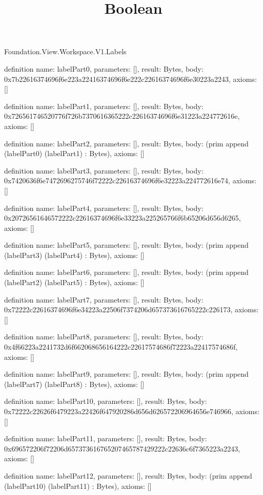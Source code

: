 \begin{lexlean}{Foundation.View.Workspace.V1.Labels}
\title{Boolean}
\begin{semanticmodule}
definition{
  name: labelPart0,
  parameters: [],
  result: Bytes,
  body: 0x7b22616374696f6e223a22416374696f6e222c22616374696f6e30223a2243,
  axioms: []
}

definition{
  name: labelPart1,
  parameters: [],
  result: Bytes,
  body: 0x726561746520776f726b7370616365222c22616374696f6e31223a224772616e,
  axioms: []
}

definition{
  name: labelPart2,
  parameters: [],
  result: Bytes,
  body: (prim append (labelPart0) (labelPart1) : Bytes),
  axioms: []
}

definition{
  name: labelPart3,
  parameters: [],
  result: Bytes,
  body: 0x7420636f6e7472696275746f72222c22616374696f6e32223a224772616e74,
  axioms: []
}

definition{
  name: labelPart4,
  parameters: [],
  result: Bytes,
  body: 0x20726561646572222c22616374696f6e33223a225265766f6b65206d656d6265,
  axioms: []
}

definition{
  name: labelPart5,
  parameters: [],
  result: Bytes,
  body: (prim append (labelPart3) (labelPart4) : Bytes),
  axioms: []
}

definition{
  name: labelPart6,
  parameters: [],
  result: Bytes,
  body: (prim append (labelPart2) (labelPart5) : Bytes),
  axioms: []
}

definition{
  name: labelPart7,
  parameters: [],
  result: Bytes,
  body: 0x72222c22616374696f6e34223a22506f7374206d657373616765222c226173,
  axioms: []
}

definition{
  name: labelPart8,
  parameters: [],
  result: Bytes,
  body: 0x4f66223a2241732d6f662068656164222c22617574686f72223a22417574686f,
  axioms: []
}

definition{
  name: labelPart9,
  parameters: [],
  result: Bytes,
  body: (prim append (labelPart7) (labelPart8) : Bytes),
  axioms: []
}

definition{
  name: labelPart10,
  parameters: [],
  result: Bytes,
  body: 0x72222c22626f6479223a22426f647920286d656d626572206964656e746966,
  axioms: []
}

definition{
  name: labelPart11,
  parameters: [],
  result: Bytes,
  body: 0x696572206f72206d657373616765207465787429222c22636c6f7365223a2243,
  axioms: []
}

definition{
  name: labelPart12,
  parameters: [],
  result: Bytes,
  body: (prim append (labelPart10) (labelPart11) : Bytes),
  axioms: []
}


\end{semanticmodule}
\end{lexlean}
